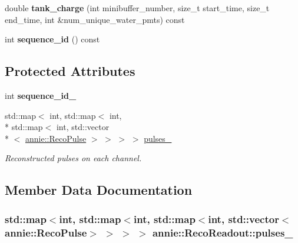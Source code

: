 \begin{DoxyCompactItemize}
\item 
\hypertarget{classannie_1_1RecoReadout_af85424158b1d9452793e041f95c9ad60}{double {\bfseries tank\-\_\-charge} (int minibuffer\-\_\-number, size\-\_\-t start\-\_\-time, size\-\_\-t end\-\_\-time, int \&num\-\_\-unique\-\_\-water\-\_\-pmts) const }\label{classannie_1_1RecoReadout_af85424158b1d9452793e041f95c9ad60}

\item 
\hypertarget{classannie_1_1RecoReadout_a52ec4886c6477e18fd8b177fe6db3cc7}{int {\bfseries sequence\-\_\-id} () const }\label{classannie_1_1RecoReadout_a52ec4886c6477e18fd8b177fe6db3cc7}

\end{DoxyCompactItemize}
\subsection*{Protected Attributes}
\begin{DoxyCompactItemize}
\item 
\hypertarget{classannie_1_1RecoReadout_a6ec2ab75a2818cb02152f165fa2cb9ad}{int {\bfseries sequence\-\_\-id\-\_\-}}\label{classannie_1_1RecoReadout_a6ec2ab75a2818cb02152f165fa2cb9ad}

\item 
std\-::map$<$ int, std\-::map$<$ int, \\*
std\-::map$<$ int, std\-::vector\\*
$<$ \hyperlink{classannie_1_1RecoPulse}{annie\-::\-Reco\-Pulse} $>$ $>$ $>$ $>$ \hyperlink{classannie_1_1RecoReadout_a17b30b6280a26c5f2a6ae48ae00d6d04}{pulses\-\_\-}
\begin{DoxyCompactList}\small\item\em Reconstructed pulses on each channel. \end{DoxyCompactList}\end{DoxyCompactItemize}


\subsection{Member Data Documentation}
\hypertarget{classannie_1_1RecoReadout_a17b30b6280a26c5f2a6ae48ae00d6d04}{
\subsubsection[{pulses\-\_\-}]{\setlength{\rightskip}{0pt plus 5cm}std\-::map$<$int, std\-::map$<$int, std\-::map$<$int, std\-::vector$<${\bf annie\-::\-Reco\-Pulse}$>$ $>$ $>$ $>$ annie\-::\-Reco\-Readout\-::pulses\-\_\-\hspace{0.3cm}{\ttfamily [protected]}}}\label{classannie_1_1RecoReadout_a17b30b6280a26c5f2a6ae48ae00d6d04}


